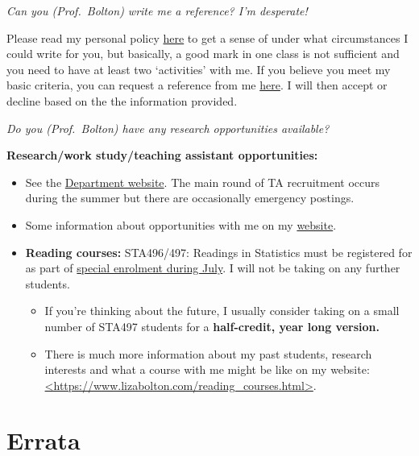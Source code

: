 \documentclass[
  openany]{book}
\begin{document}
\emph{Can you (Prof.~Bolton) write me a reference? I'm desperate!}

Please read my personal policy \href{https://www.lizabolton.com/references.html}{here} to get a sense of under what circumstances I could write for you, but basically, a good mark in one class is not sufficient and you need to have at least two `activities' with me. {If you believe you meet my basic criteria, you can request a reference from me \href{https://forms.office.com/r/XHqjGXjCru}{here}.} I will then accept or decline based on the the information provided.

\emph{Do you (Prof.~Bolton) have any research opportunities available?}

\textbf{Research/work study/teaching assistant opportunities:}

\begin{itemize}
\item
  See the \href{https://www.statistics.utoronto.ca/employment-opportunities/cupe-positions-unit-1}{Department website}. The main round of TA recruitment occurs during the summer but there are occasionally emergency postings.
\item
  Some information about opportunities with me on my \href{https://www.lizabolton.com/opportunities.html}{website}.
\item
  \textbf{Reading courses:} STA496/497: Readings in Statistics must be registered for as part of \href{https://utoronto.sharepoint.com/sites/ArtSci-STA/Undergrad/SitePages/Special-Enrolment-Courses--STA490Y1,-STA492H1-and-STA496H1-STA497H1.aspx}{special enrolment during July}. I will not be taking on any further students.

  \begin{itemize}
  \item
    If you're thinking about the future, I usually consider taking on a small number of STA497 students for a \textbf{half-credit, year long version.}
  \item
    There is much more information about my past students, research interests and what a course with me might be like on my website: \href{https://www.lizabolton.com/reading_courses.html}{\textless https://www.lizabolton.com/reading\_courses.html\textgreater{}}.
  \end{itemize}
\end{itemize}

\hypertarget{errata}{%
\section{Errata}\label{errata}}
\end{document}
